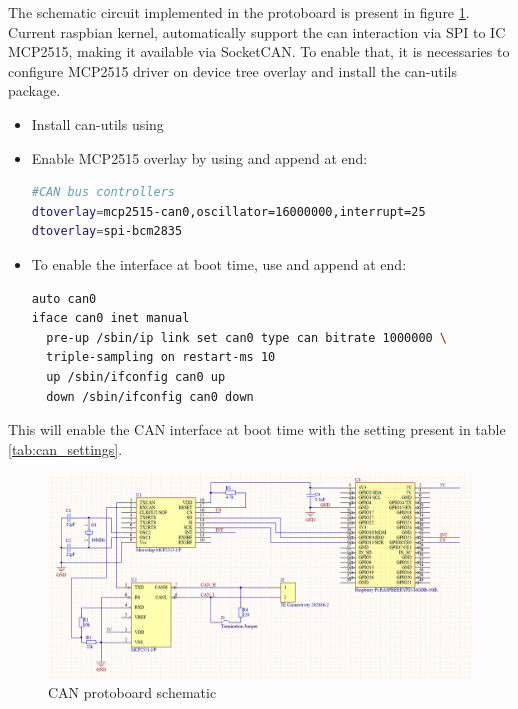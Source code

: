 The schematic circuit implemented in the protoboard is present in figure \ref{fig:schematic_proto_can}.
Current raspbian kernel, automatically support the can interaction via \gls{SPI} to \gls{IC} MCP2515, making it available via SocketCAN. To enable that, it is necessaries to configure MCP2515 driver on device tree overlay and install the can-utils package.
\begin{itemize}
	\tightlist
	\item Install can-utils using 
	\item Enable MCP2515 overlay by using  and append at end:
	\begin{lstlisting}[label={lst:boot_settings},frame=none,language=bash,backgroundcolor=\color{gray!15},numbers=none,basicstyle=\ttfamily]
#CAN bus controllers
dtoverlay=mcp2515-can0,oscillator=16000000,interrupt=25
dtoverlay=spi-bcm2835
\end{lstlisting}
	\item To enable the interface at boot time, use  and append at end:
	\begin{minipage}{\linewidth} %
\begin{lstlisting}[frame=none,language=bash,backgroundcolor=\color{gray!15},numbers=none,		basicstyle=\ttfamily]
auto can0
iface can0 inet manual
  pre-up /sbin/ip link set can0 type can bitrate 1000000 \
  triple-sampling on restart-ms 10
  up /sbin/ifconfig can0 up
  down /sbin/ifconfig can0 down
\end{lstlisting}
	\end{minipage}
\end{itemize}
This will enable the \gls{CAN} interface at boot time with the setting present in table \ref{tab:can_settings}.

\begin{figure}[!hb]
	\centering
	\includegraphics[width=0.9\linewidth]{figures/protoschematic}
	\caption{CAN protoboard schematic}
	\label{fig:schematic_proto_can}
\end{figure}

